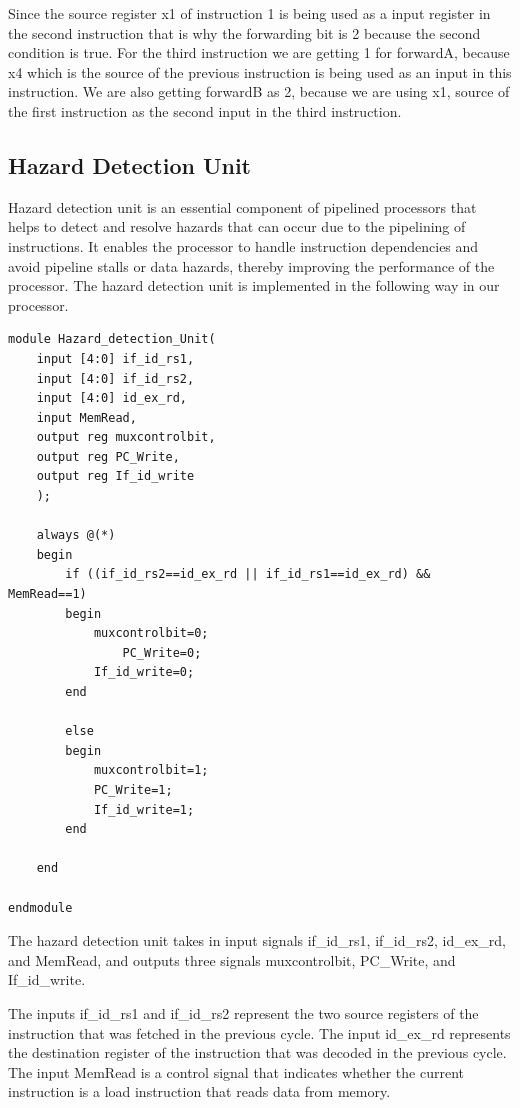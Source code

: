 \documentclass{article}
\begin{document}
Since the source register x1 of instruction 1 is being used as a input register in the second instruction that is why the forwarding bit is 2 because the second condition is true. For the third instruction we are getting 1 for forwardA, because x4 which is the source of the previous instruction is being used as an input in this instruction. We are also getting forwardB as 2, because we are using x1, source of the first instruction as the second input in the third instruction.

\subsection{Hazard Detection Unit}
Hazard detection unit is an essential component of pipelined processors that helps to detect and resolve hazards that can occur due to the pipelining of instructions. It enables the processor to handle instruction dependencies and avoid pipeline stalls or data hazards, thereby improving the performance of the processor. The hazard detection unit is implemented in the following way in our processor.

\begin{lstlisting}[caption={Hazard Detection Unit}, captionpos=b, language=RISC-V]
module Hazard_detection_Unit(
    input [4:0] if_id_rs1,
    input [4:0] if_id_rs2,
    input [4:0] id_ex_rd,
    input MemRead,
    output reg muxcontrolbit,
    output reg PC_Write,
    output reg If_id_write
    );
    
    always @(*)    
    begin 
        if ((if_id_rs2==id_ex_rd || if_id_rs1==id_ex_rd) &&  MemRead==1)
        begin
            muxcontrolbit=0;
                PC_Write=0;         
            If_id_write=0;
        end
        
        else 
        begin
            muxcontrolbit=1;
            PC_Write=1;
            If_id_write=1;
        end 
        
    end 
    
endmodule
\end{lstlisting}

The hazard detection unit takes in input signals if\_id\_rs1, if\_id\_rs2, id\_ex\_rd, and MemRead, and outputs three signals muxcontrolbit, PC\_Write, and If\_id\_write.

The inputs if\_id\_rs1 and if\_id\_rs2 represent the two source registers of the instruction that was fetched in the previous cycle. The input id\_ex\_rd represents the destination register of the instruction that was decoded in the previous cycle. The input MemRead is a control signal that indicates whether the current instruction is a load instruction that reads data from memory.
\end{document}
